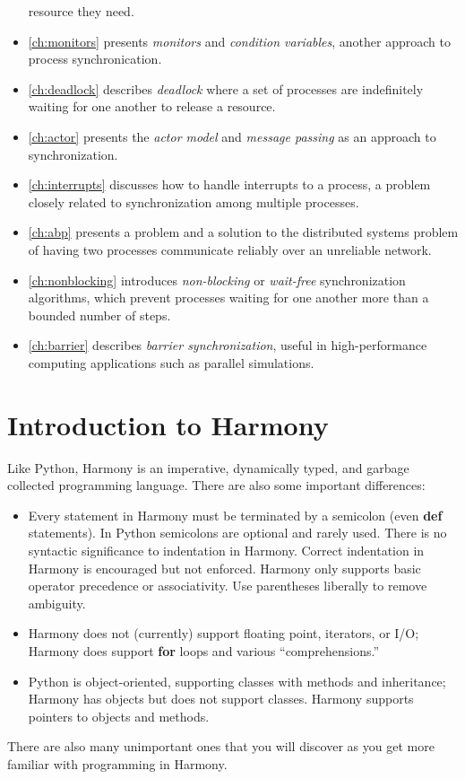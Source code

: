 \documentclass{report}
\begin{document}
\begin{itemize}
resource they need.
\item \autoref{ch:monitors} presents
\emph{monitors} and \emph{condition variables},
another approach to process synchronication.
\item \autoref{ch:deadlock} describes \emph{deadlock}
where a set of processes are indefinitely waiting for one another to
release a resource.
\item \autoref{ch:actor} presents the \emph{actor model}
and \emph{message passing} as an approach to synchronization.
\item \autoref{ch:interrupts} discusses how to handle interrupts to a process,
a problem closely related to synchronization among multiple processes.
\item \autoref{ch:abp} presents a problem and a solution to the distributed
systems problem of having two processes communicate reliably over an unreliable
network.
\item \autoref{ch:nonblocking} introduces \emph{non-blocking} or
\emph{wait-free} synchronization algorithms,
which prevent processes waiting for one another more than a bounded number of
steps.
\item \autoref{ch:barrier} describes \emph{barrier synchronization},
useful in high-performance computing applications such as parallel simulations.
\end{itemize}

\chapter{Introduction to Harmony}
\label{ch:harmonyintro}

Like Python, Harmony is an imperative,
dynamically typed, and garbage collected programming language.
There are also some important differences:
\begin{itemize}
\item Every statement in Harmony must be terminated by a semicolon
(even \textbf{def} statements).
In Python semicolons are optional and rarely used.
There is no syntactic significance to indentation in Harmony.
Correct indentation in Harmony is encouraged but not enforced.
Harmony only supports basic operator precedence or associativity.
Use parentheses liberally to remove ambiguity.
\item Harmony does not (currently) support floating point, iterators, or I/O;
Harmony does support \textbf{for} loops and various ``comprehensions.''
\item Python is object-oriented, supporting classes with methods and
inheritance; Harmony has objects but does not support classes.  Harmony supports
pointers to objects and methods.
\end{itemize}
There are also many unimportant ones that you will discover as
you get more familiar with programming in Harmony.
\end{document}
